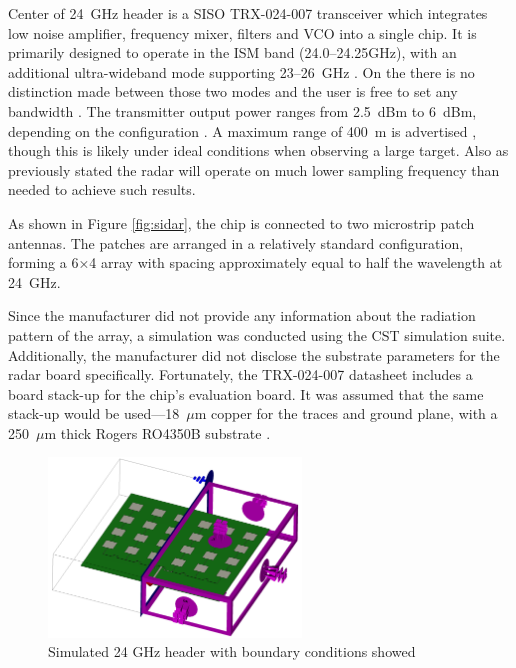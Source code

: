 Center of 24~GHz header is a SISO TRX-024-007 transceiver which integrates low noise amplifier, frequency mixer, filters and VCO into a single chip.
It is primarily designed to operate in the ISM band (24.0--24.25GHz), with an additional ultra-wideband mode supporting 23--26~GHz \cite{sidarTRX24}.
On the \sidar there is no distinction made between  those two modes and the user is free to set any bandwidth \cite{sidarPRO} .
The transmitter output power ranges from 2.5~dBm to 6~dBm, depending on the configuration \cite{sidarTRX24}.
A maximum range of 400~m is advertised \cite{sidarMANOld}, though this is likely under ideal conditions when observing a large target.
Also as previously stated the radar will operate on much lower sampling frequency than needed to achieve such results.


As shown in Figure \ref{fig:sidar}, the chip is connected to two microstrip patch antennas.
The patches are arranged in a relatively standard configuration, forming a 6×4 array with spacing approximately equal to half the wavelength at 24~GHz.

Since the manufacturer did not provide any information about the radiation pattern of the array, a simulation was conducted using the CST simulation suite.
Additionally, the manufacturer did not disclose the substrate parameters for the radar board specifically.
Fortunately, the TRX-024-007 datasheet includes a board stack-up for the chip's evaluation board.
It was assumed that the same stack-up would be used—18~$\mu$m copper for the traces and ground plane, with a 250~$\mu$m thick Rogers RO4350B substrate \cite{sidarTRX24}.

\begin{figure}[ht!]
  \centering
  \includegraphics[width=0.6\textwidth]{../img/boundaries.png}
  \caption[Simulated 24 GHz header with boundary conditions showed]{Simulated 24 GHz header with boundary conditions showed}
  \label{fig:boundaries}
\end{figure}


